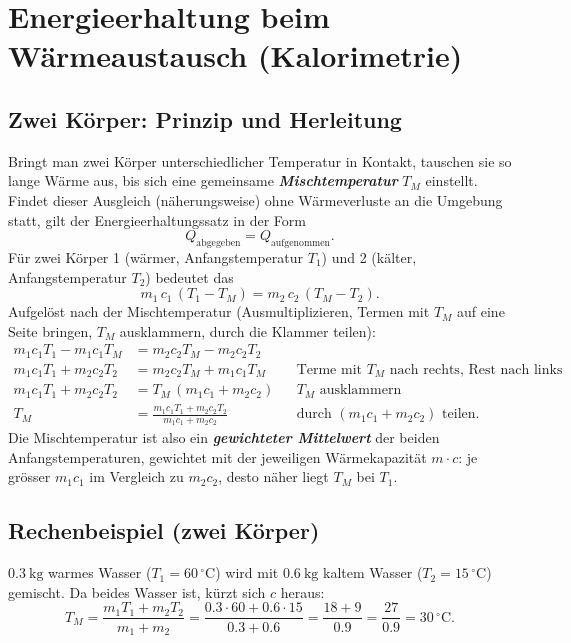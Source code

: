 \documentclass[11pt,a4paper]{article}
\newcommand{\Temp}{T}
\newcommand{\celsius}{\ensuremath{^{\circ}\mathrm{C}}}
\begin{document}
\section{Energieerhaltung beim Wärmeaustausch (Kalorimetrie)}

\subsection{Zwei Körper: Prinzip und Herleitung}
Bringt man zwei Körper unterschiedlicher Temperatur in Kontakt, tauschen sie so lange Wärme aus, bis sich eine gemeinsame \textbf{\emph{Mischtemperatur}} $\Temp_M$ einstellt. Findet dieser Ausgleich (näherungsweise) ohne Wärmeverluste an die Umgebung statt, gilt der Energieerhaltungssatz in der Form
\[
  Q_{\text{abgegeben}} = Q_{\text{aufgenommen}}.
\]
Für zwei Körper 1 (wärmer, Anfangstemperatur $\Temp_1$) und 2 (kälter, Anfangstemperatur $\Temp_2$) bedeutet das
\[
  m_1\,c_1\,(\Temp_1-\Temp_M) = m_2\,c_2\,(\Temp_M-\Temp_2).
\]
Aufgelöst nach der Mischtemperatur (Ausmultiplizieren, Termen mit $\Temp_M$ auf eine Seite bringen, $\Temp_M$ ausklammern, durch die Klammer teilen):
\begin{align*}
  m_1c_1\Temp_1 - m_1c_1\Temp_M &= m_2c_2\Temp_M - m_2c_2\Temp_2 \\
  m_1c_1\Temp_1 + m_2c_2\Temp_2 &= m_2c_2\Temp_M + m_1c_1\Temp_M && \text{Terme mit } \Temp_M \text{ nach rechts, Rest nach links} \\
  m_1c_1\Temp_1 + m_2c_2\Temp_2 &= \Temp_M\,(m_1c_1+m_2c_2) && \text{$\Temp_M$ ausklammern} \\
  \Temp_M &= \frac{m_1c_1\Temp_1 + m_2c_2\Temp_2}{m_1c_1+m_2c_2} && \text{durch } (m_1c_1+m_2c_2) \text{ teilen}.
\end{align*}
Die Mischtemperatur ist also ein \textbf{\emph{gewichteter Mittelwert}} der beiden Anfangstemperaturen, gewichtet mit der jeweiligen Wärmekapazität $m\cdot c$: je grösser $m_1c_1$ im Vergleich zu $m_2c_2$, desto näher liegt $\Temp_M$ bei $\Temp_1$.

\subsection{Rechenbeispiel (zwei Körper)}
$0.3\ \mathrm{kg}$ warmes Wasser ($\Temp_1=60\,\celsius$) wird mit $0.6\ \mathrm{kg}$ kaltem Wasser ($\Temp_2=15\,\celsius$) gemischt. Da beides Wasser ist, kürzt sich $c$ heraus:
\[
  \Temp_M = \frac{m_1\Temp_1+m_2\Temp_2}{m_1+m_2} = \frac{0.3\cdot 60 + 0.6\cdot 15}{0.3+0.6} = \frac{18+9}{0.9} = \frac{27}{0.9} = 30\,\celsius.
\]
\end{document}
